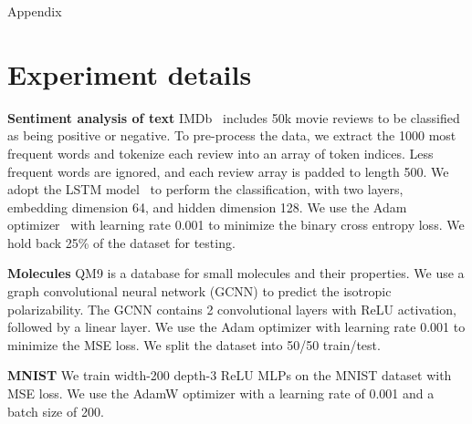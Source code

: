 \documentclass{article} %
\begin{document}


%

\newpage

{\huge Appendix}
\appendix

\section{Experiment details}\label{app:exp_details}


{\bf Sentiment analysis of text}
IMDb~\citep{maas2011learning} includes 50k movie reviews to be classified as being positive or negative. To pre-process the data, we extract the 1000 most frequent words and tokenize each review into an array of token indices. Less frequent words are ignored, and each review array is padded to length 500. We adopt the LSTM model~\citep{hochreiter1997long} to perform the classification, with two layers, embedding dimension 64, and hidden dimension 128. We use the Adam optimizer~\citep{kingma2014adam} with learning rate 0.001 to minimize the binary cross entropy loss. We hold back 25\% of the dataset for testing.

{\bf Molecules} QM9 is a database for small molecules and their properties. We use a graph convolutional neural network (GCNN) to predict the isotropic polarizability. The GCNN contains 2 convolutional layers with ReLU activation, followed by a linear layer. We use the Adam optimizer with learning rate 0.001 to minimize the MSE loss. We split the dataset into 50/50 train/test.

{\bf MNIST} We train width-200 depth-3 ReLU MLPs on the MNIST dataset with MSE loss. We use the AdamW optimizer with a learning rate of 0.001 and a batch size of 200.


\end{document}
